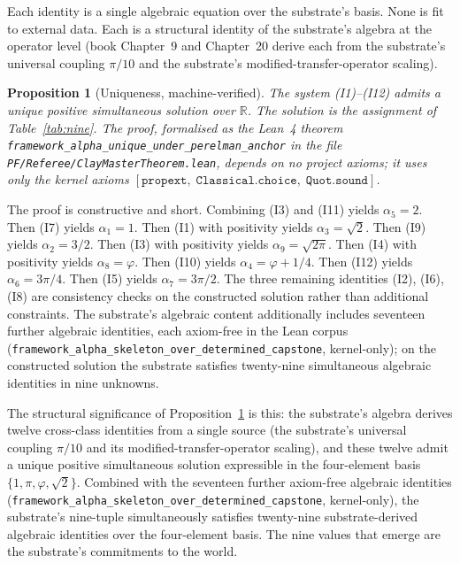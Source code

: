 \documentclass[11pt,a4paper]{amsart}
\theoremstyle{plain}
\newtheorem{proposition}[theorem]{Proposition}
\theoremstyle{definition}
\begin{document}
Each identity is a single algebraic equation over the substrate's basis. None is fit to external data. Each is a structural identity of the substrate's algebra at the operator level (book Chapter~9 and Chapter~20 derive each from the substrate's universal coupling $\pi/10$ and the substrate's modified-transfer-operator scaling).

\begin{proposition}[Uniqueness, machine-verified]\label{prop:unique}
The system \textup{(I1)--(I12)} admits a unique positive simultaneous solution over $\mathbb{R}$. The solution is the assignment of Table~\ref{tab:nine}. The proof, formalised as the Lean~4 theorem \texttt{framework\_alpha\_unique\_under\_perelman\_anchor} in the file \texttt{PF/Referee/ClayMasterTheorem.lean}, depends on no project axioms; it uses only the kernel axioms $[\texttt{propext},\;\texttt{Classical.choice},\;\texttt{Quot.sound}]$.
\end{proposition}

The proof is constructive and short. Combining (I3) and (I11) yields $\alpha_5 = 2$. Then (I7) yields $\alpha_1 = 1$. Then (I1) with positivity yields $\alpha_3 = \sqrt{2}$. Then (I9) yields $\alpha_2 = 3/2$. Then (I3) with positivity yields $\alpha_9 = \sqrt{2\pi}$. Then (I4) with positivity yields $\alpha_8 = \varphi$. Then (I10) yields $\alpha_4 = \varphi + 1/4$. Then (I12) yields $\alpha_6 = 3\pi/4$. Then (I5) yields $\alpha_7 = 3\pi/2$. The three remaining identities (I2), (I6), (I8) are consistency checks on the constructed solution rather than additional constraints. The substrate's algebraic content additionally includes seventeen further algebraic identities, each axiom-free in the Lean corpus (\texttt{framework\_alpha\_skeleton\_over\_determined\_capstone}, kernel-only); on the constructed solution the substrate satisfies twenty-nine simultaneous algebraic identities in nine unknowns.

The structural significance of Proposition~\ref{prop:unique} is this: the substrate's algebra derives twelve cross-class identities from a single source (the substrate's universal coupling $\pi/10$ and its modified-transfer-operator scaling), and these twelve admit a unique positive simultaneous solution expressible in the four-element basis $\{1, \pi, \varphi, \sqrt{2}\}$. Combined with the seventeen further axiom-free algebraic identities (\texttt{framework\_alpha\_skeleton\_over\_determined\_capstone}, kernel-only), the substrate's nine-tuple simultaneously satisfies twenty-nine substrate-derived algebraic identities over the four-element basis. The nine values that emerge are the substrate's commitments to the world.
\end{document}
